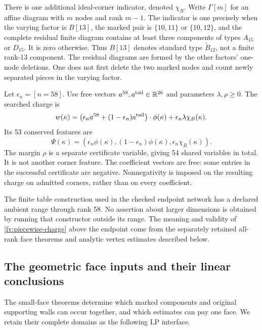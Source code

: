 There is one additional ideal-corner indicator, denoted $\chi_B$.
Write $\Gamma[m]$ for an affine diagram with $m$ nodes and rank $m-1$.
The indicator is one precisely when the varying factor is $B[13]$,
the marked pair is $\{10,11\}$ or $\{10,12\}$, and the complete
residual finite diagram contains at least three components of types
$A_{15}$ or $D_{15}$. It is zero otherwise. Thus $B[13]$ denotes
standard type $\widetilde B_{12}$, not a finite rank-13 component.
The residual diagrams are formed by the other factors' one-node
deletions. One does not first delete the two marked nodes and count
newly separated pieces in the varying factor.

Let $\epsilon_n=[n=58]$. Use free vectors
$a^{58},a^{\rm tail}\in\mathbb R^{26}$ and parameters $\lambda,\rho\ge0$.
The searched charge is
\begin{equation}\label{fv:piecewise-charge}
 w(\kappa)=
 \bigl(\epsilon_na^{58}+(1-\epsilon_n)a^{\rm tail}\bigr)
       \cdot\phi(\kappa)+\epsilon_n\lambda\chi_B(\kappa).
\end{equation}
Its 53 conserved features are
\begin{equation}\label{fv:conserved-features}
 \Psi(\kappa)=
 (\epsilon_n\phi(\kappa),(1-\epsilon_n)\phi(\kappa),
                     \epsilon_n\chi_B(\kappa)).
\end{equation}
The margin $\rho$ is a separate certificate variable, giving 54
shared variables in total. It is not another corner feature.
The coefficient vectors are free: some entries in the successful
certificate are negative. Nonnegativity is imposed on the resulting
charge on admitted corners, rather than on every coefficient.

The finite table construction used in the checked endpoint network
has a declared ambient range through rank 58. No assertion about
larger dimensions is obtained by running that constructor outside
its range. The meaning and validity of \eqref{fv:piecewise-charge}
above the endpoint come from the separately retained all-rank face
theorems and analytic vertex estimates described below.

\subsection{The geometric face inputs and their linear conclusions}
\label{fv:face-inputs}

The small-face theorems determine which marked components and original
supporting walls can occur together, and which estimates can pay one
face. We retain their complete domains as the following LP interface.


